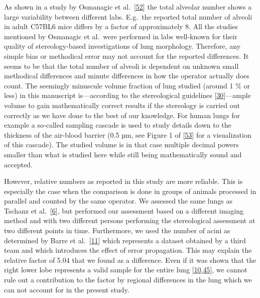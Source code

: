 \documentclass[
  american,
]{article}
\begin{document}
As shown in a study by Osmanagic et al.~{[}\protect\hyperlink{ref-LzalnLBH}{52}{]} the total alveolar number shows a large variability between different labs.
E.g.~the reported total number of alveoli in adult C57BL6 mice differs by a factor of approximately 8.
All the studies mentioned by Osmanagic et al.~were performed in labs well-known for their quality of stereology-based investigations of lung morphology.
Therefore, any simple bias or methodical error may not account for the reported differences.
It seems to be that the total number of alveoli is dependent on unknown small methodical differences and minute differences in how the operator actually does count.
The seemingly minuscule volume fraction of lung studied (around 1 \% or less) in this manuscript is---according to the stereological guidelines {[}\protect\hyperlink{ref-dNc8FfNn}{30}{]}---ample volume to gain mathematically correct results if the stereology is carried out correctly as we have done to the best of our knowledge.
For human lungs for example a so-called sampling cascade is used to study details down to the thickness of the air-blood barrier (0.5 µm, see Figure 1 of {[}\protect\hyperlink{ref-1CLJ32t5m}{53}{]} for a visualization of this cascade).
The studied volume is in that case multiple decimal powers smaller than what is studied here while still being mathematically sound and accepted.

However, relative numbers as reported in this study are more reliable.
This is especially the case when the comparison is done in groups of animals processed in parallel and counted by the same operator.
We assessed the same lungs as Tschanz et al.~{[}\protect\hyperlink{ref-wnl86DEM}{6}{]}, but performed our assessment based on a different imaging method and with two different persons performing the stereological assessment at two different points in time.
Furthermore, we used the number of acini as determined by Barre et al.~{[}\protect\hyperlink{ref-uFNlWogb}{11}{]} which represents a dataset obtained by a third team and which introduces the effect of error propagation.
This may explain the relative factor of 5.04 that we found as a difference.
Even if it was shown that the right lower lobe represents a valid sample for the entire lung {[}\protect\hyperlink{ref-14OP85b2F}{10},\protect\hyperlink{ref-I9TmP6IU}{45}{]}, we cannot rule out a contribution to the factor by regional differences in the lung which we can not account for in the present study.
\end{document}
